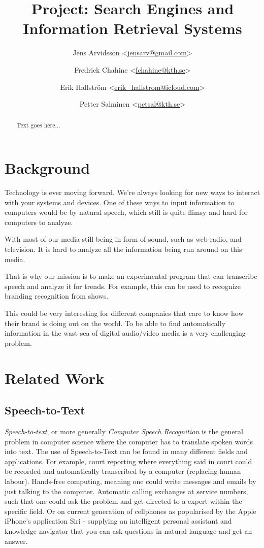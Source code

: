\documentclass[a4paper,11pt,twoside]{ltxdoc}
\title{Project: Search Engines and Information Retrieval Systems}
\author{
Jens Arvidsson <\href{mailto:jensarv@gmail.com}{jensarv@gmail.com}> \and
Fredrick Chahine <\href{mailto:fchahine@kth.se}{fchahine@kth.se}> \and
Erik Hallström  <\href{mailto:erik_hallstrom@icloud.com}{erik_hallstrom@icloud.com}> \and
Petter Salminen <\href{mailto:petsal@kth.se}{petsal@kth.se}>}
\begin{document}
\maketitle
\tableofcontents

\newpage
\begin{abstract}
Text goes here...

\end{abstract}

\newpage
\section{Background}
Technology is ever moving forward. We're always looking for new ways to interact with your systems and devices. One of these ways to input information to computers would be by natural speech, which still is quite flimsy and hard for computers to analyze. 

With most of our media still being in form of sound, such  as web-radio, and television. It is hard to analyze all the information being run around on this media. 

That is why our mission is to make an experimental program that can transcribe speech and analyze it for trends. For example, this can be used to recognize branding recognition from shows.

This could be very interesting for different companies that care to know how their brand is doing out on the world. To be able to find automatically information in the wast sea of digital audio/video media is a very challenging problem.



\section{Related Work}
\subsection{Speech-to-Text}
\emph{Speech-to-text}, or more generally \emph{Computer Speech Recognition} is the general problem in computer science where the computer has to translate spoken words into text. The use of Speech-to-Text can be found in many different fields and applications. For example, court reporting where everything said in court could be recorded and automatically transcribed by a computer (replacing human labour). Hands-free computing, meaning one could write messages and emails by just talking to the computer. Automatic calling exchanges at service numbers, such that one could ask the problem and get directed to a expert within the specific field. Or on current generation of cellphones as popularised by the Apple iPhone's application Siri - supplying an intelligent personal assistant and knowledge navigator that you can ask questions in natural language and get an answer. 
\end{document}
